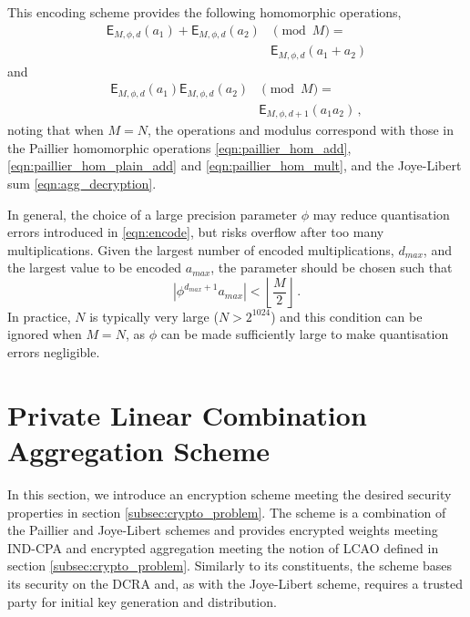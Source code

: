 \documentclass[10pt,letterpaper,oneside,twocolumn,journal]{IEEEtran}
\theoremstyle{definition}
\theoremstyle{definition}
\theoremstyle{remark}
\begin{document}
This encoding scheme provides the following homomorphic operations,
\begin{equation}
    \begin{split}
        \mathsf{E}_{M,\phi,d}(a_1) + \mathsf{E}_{M,\phi,d}(a_2)& \pmod{M} =\\
        &\mathsf{E}_{M,\phi,d}(a_1+a_2)
    \end{split}\label{eqn:encoding_homomorphic_add}
\end{equation}
and
\begin{equation}
    \begin{split}
        \mathsf{E}_{M,\phi,d}(a_1)\mathsf{E}_{M,\phi,d}(a_2)& \pmod{M} =\\
        &\mathsf{E}_{M,\phi,d+1}(a_1a_2)\,,
    \end{split}
\end{equation}
noting that when $M=N$, the operations and modulus correspond with those in the Paillier homomorphic operations \eqref{eqn:paillier_hom_add}, \eqref{eqn:paillier_hom_plain_add} and \eqref{eqn:paillier_hom_mult}, and the Joye-Libert sum \eqref{eqn:agg_decryption}.

In general, the choice of a large precision parameter $\phi$ may reduce quantisation errors introduced in \eqref{eqn:encode}, but risks overflow after too many multiplications. Given the largest number of encoded multiplications, $d_{max}$, and the largest value to be encoded $a_{max}$, the parameter should be chosen such that
\begin{equation}
    \left|\phi^{d_{max}+1}a_{max}\right| < \left\lfloor \frac{M}{2} \right\rfloor\,.
\end{equation}
In practice, $N$ is typically very large ($N>2^{1024}$) and this condition can be ignored when $M=N$, as $\phi$ can be made sufficiently large to make quantisation errors negligible.

% 
%                                            
%                                            
%                                            
% 

\section{Private Linear Combination Aggregation Scheme} \label{sec:lcao_scheme}
In this section, we introduce an encryption scheme meeting the desired security properties in section \ref{subsec:crypto_problem}. The scheme is a combination of the Paillier and Joye-Libert schemes and provides encrypted weights meeting IND-CPA and encrypted aggregation meeting the notion of LCAO defined in section \ref{subsec:crypto_problem}. Similarly to its constituents, the scheme bases its security on the DCRA and, as with the Joye-Libert scheme, requires a trusted party for initial key generation and distribution. 
\end{document}
